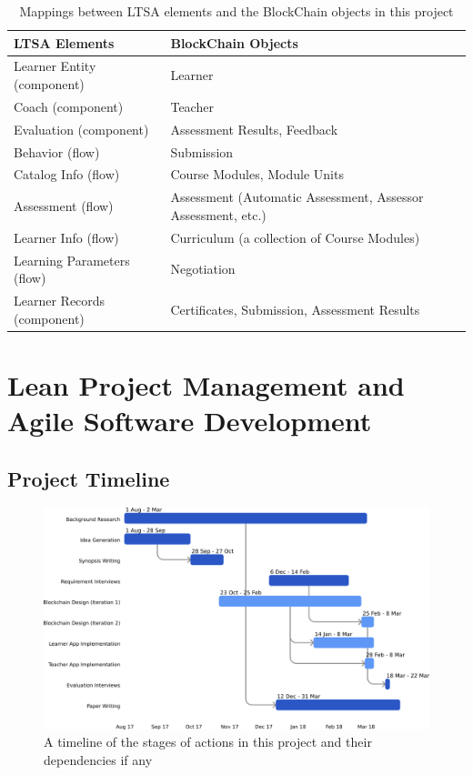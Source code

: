 \begin{table}[!h] 
    \caption{Mappings between LTSA elements and the BlockChain objects in this project}
    \centering
    \label{table:ltsa-bcu}
    \begin{tabularx}{\textwidth}{l|X}
        \textbf{LTSA Elements} & \textbf{BlockChain Objects}
        \\\toprule
        Learner Entity (component) & Learner
        \\\midrule
        Coach (component) & Teacher
        \\\midrule
        Evaluation (component) & Assessment Results, Feedback
        \\\midrule
        Behavior (flow) & Submission
        \\\midrule
        Catalog Info (flow) & Course Modules, Module Units
        \\\midrule
        Assessment (flow) & Assessment (Automatic Assessment, Assessor Assessment, etc.)
        \\\midrule
        Learner Info (flow) & Curriculum (a collection of Course Modules)
        \\\midrule
        Learning Parameters (flow) & Negotiation
        \\\midrule
        Learner Records (component) & Certificates, Submission, Assessment Results
        \\\bottomrule
    \end{tabularx}
\end{table}

\section{Lean Project Management and Agile Software Development}

\subsection{Project Timeline}

\begin{figure}[!hb]
    \centering
    \includegraphics[width=1.0\textwidth]{simple_gantt}
    \caption[Project Timeline]
        {A timeline of the stages of actions in this project and their dependencies if any}
    \label{fig:simple_gantt}
\end{figure}

